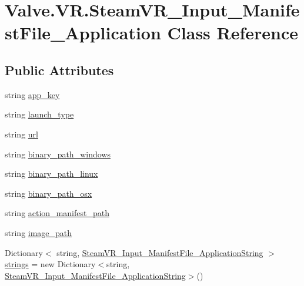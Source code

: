 \hypertarget{class_valve_1_1_v_r_1_1_steam_v_r___input___manifest_file___application}{}\section{Valve.\+V\+R.\+Steam\+V\+R\+\_\+\+Input\+\_\+\+Manifest\+File\+\_\+\+Application Class Reference}
\label{class_valve_1_1_v_r_1_1_steam_v_r___input___manifest_file___application}
\subsection*{Public Attributes}
\begin{DoxyCompactItemize}
\item 
string \mbox{\hyperlink{class_valve_1_1_v_r_1_1_steam_v_r___input___manifest_file___application_abaa589fc25aa2a7a4ed9798c1721b862}{app\+\_\+key}}
\item 
string \mbox{\hyperlink{class_valve_1_1_v_r_1_1_steam_v_r___input___manifest_file___application_a01d2e083a5071d58471342aa75e20c51}{launch\+\_\+type}}
\item 
string \mbox{\hyperlink{class_valve_1_1_v_r_1_1_steam_v_r___input___manifest_file___application_afe02d2c838a9022c98558a0f3627b1c0}{url}}
\item 
string \mbox{\hyperlink{class_valve_1_1_v_r_1_1_steam_v_r___input___manifest_file___application_ac07cc8e2af07cf47a28328f57b9591d0}{binary\+\_\+path\+\_\+windows}}
\item 
string \mbox{\hyperlink{class_valve_1_1_v_r_1_1_steam_v_r___input___manifest_file___application_adfcfdc80c58cb624de408c708e3ccdde}{binary\+\_\+path\+\_\+linux}}
\item 
string \mbox{\hyperlink{class_valve_1_1_v_r_1_1_steam_v_r___input___manifest_file___application_ae2bfd567fd2e1c43b90311050993035b}{binary\+\_\+path\+\_\+osx}}
\item 
string \mbox{\hyperlink{class_valve_1_1_v_r_1_1_steam_v_r___input___manifest_file___application_acfee504211cb44bf005f1541e8a8072c}{action\+\_\+manifest\+\_\+path}}
\item 
string \mbox{\hyperlink{class_valve_1_1_v_r_1_1_steam_v_r___input___manifest_file___application_aa671ccc9cf78904f416fd07ed71067ae}{image\+\_\+path}}
\item 
Dictionary$<$ string, \mbox{\hyperlink{class_valve_1_1_v_r_1_1_steam_v_r___input___manifest_file___application_string}{Steam\+V\+R\+\_\+\+Input\+\_\+\+Manifest\+File\+\_\+\+Application\+String}} $>$ \mbox{\hyperlink{class_valve_1_1_v_r_1_1_steam_v_r___input___manifest_file___application_a7f4c9d62b0c5a90e0b26498faa85f27f}{strings}} = new Dictionary$<$string, \mbox{\hyperlink{class_valve_1_1_v_r_1_1_steam_v_r___input___manifest_file___application_string}{Steam\+V\+R\+\_\+\+Input\+\_\+\+Manifest\+File\+\_\+\+Application\+String}}$>$()
\end{DoxyCompactItemize}


